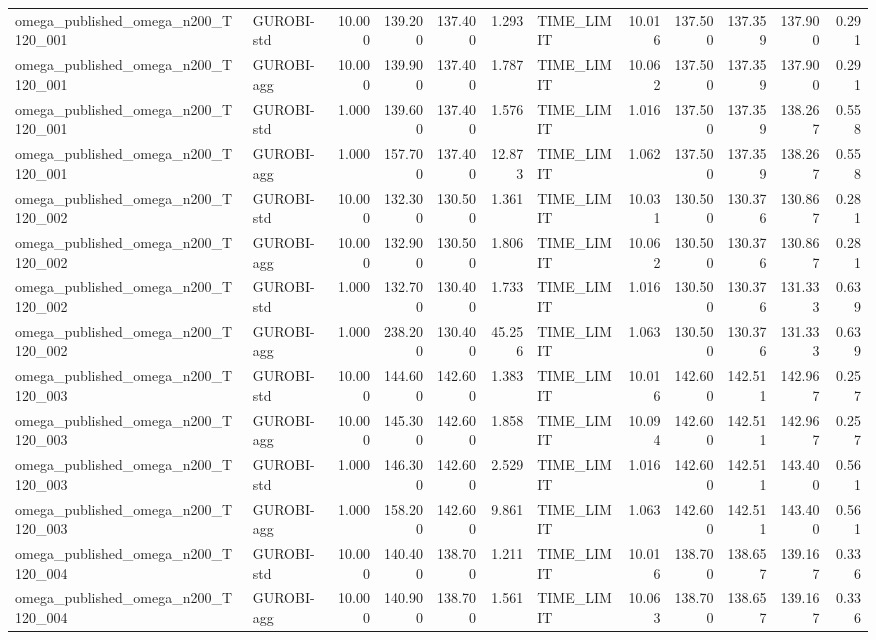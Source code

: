 \begin{table}[htbp]
\begin{tabular}{llrrrrlrrrrr}
omega\_published\_omega\_n200\_T120\_001 & GUROBI-std & 10.000 & 139.200 & 137.400 & 1.293 & TIME\_LIMIT & 10.016 & 137.500 & 137.359 & 137.900 & 0.291 \\
omega\_published\_omega\_n200\_T120\_001 & GUROBI-agg & 10.000 & 139.900 & 137.400 & 1.787 & TIME\_LIMIT & 10.062 & 137.500 & 137.359 & 137.900 & 0.291 \\
omega\_published\_omega\_n200\_T120\_001 & GUROBI-std & 1.000 & 139.600 & 137.400 & 1.576 & TIME\_LIMIT & 1.016 & 137.500 & 137.359 & 138.267 & 0.558 \\
omega\_published\_omega\_n200\_T120\_001 & GUROBI-agg & 1.000 & 157.700 & 137.400 & 12.873 & TIME\_LIMIT & 1.062 & 137.500 & 137.359 & 138.267 & 0.558 \\
omega\_published\_omega\_n200\_T120\_002 & GUROBI-std & 10.000 & 132.300 & 130.500 & 1.361 & TIME\_LIMIT & 10.031 & 130.500 & 130.376 & 130.867 & 0.281 \\
omega\_published\_omega\_n200\_T120\_002 & GUROBI-agg & 10.000 & 132.900 & 130.500 & 1.806 & TIME\_LIMIT & 10.062 & 130.500 & 130.376 & 130.867 & 0.281 \\
omega\_published\_omega\_n200\_T120\_002 & GUROBI-std & 1.000 & 132.700 & 130.400 & 1.733 & TIME\_LIMIT & 1.016 & 130.500 & 130.376 & 131.333 & 0.639 \\
omega\_published\_omega\_n200\_T120\_002 & GUROBI-agg & 1.000 & 238.200 & 130.400 & 45.256 & TIME\_LIMIT & 1.063 & 130.500 & 130.376 & 131.333 & 0.639 \\
omega\_published\_omega\_n200\_T120\_003 & GUROBI-std & 10.000 & 144.600 & 142.600 & 1.383 & TIME\_LIMIT & 10.016 & 142.600 & 142.511 & 142.967 & 0.257 \\
omega\_published\_omega\_n200\_T120\_003 & GUROBI-agg & 10.000 & 145.300 & 142.600 & 1.858 & TIME\_LIMIT & 10.094 & 142.600 & 142.511 & 142.967 & 0.257 \\
omega\_published\_omega\_n200\_T120\_003 & GUROBI-std & 1.000 & 146.300 & 142.600 & 2.529 & TIME\_LIMIT & 1.016 & 142.600 & 142.511 & 143.400 & 0.561 \\
omega\_published\_omega\_n200\_T120\_003 & GUROBI-agg & 1.000 & 158.200 & 142.600 & 9.861 & TIME\_LIMIT & 1.063 & 142.600 & 142.511 & 143.400 & 0.561 \\
omega\_published\_omega\_n200\_T120\_004 & GUROBI-std & 10.000 & 140.400 & 138.700 & 1.211 & TIME\_LIMIT & 10.016 & 138.700 & 138.657 & 139.167 & 0.336 \\
omega\_published\_omega\_n200\_T120\_004 & GUROBI-agg & 10.000 & 140.900 & 138.700 & 1.561 & TIME\_LIMIT & 10.063 & 138.700 & 138.657 & 139.167 & 0.336 \\

\end{tabular}
\end{table}
